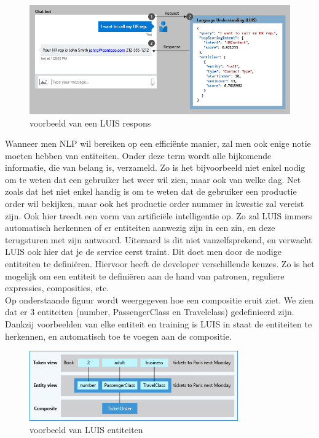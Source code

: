 \begin{figure}[H]
    \centering
    \includegraphics[width=1\textwidth]{img/LuisIntents}
\caption{voorbeeld van een LUIS respons \cite{Microsoft2019c}}
\end{figure}

Wanneer men NLP wil bereiken op een efficiënte manier, zal men ook enige notie moeten hebben van entiteiten. Onder deze term wordt alle bijkomende informatie, die van belang is, verzameld. Zo is het bijvoorbeeld niet enkel nodig om te weten dat een gebruiker het weer wil zien, maar ook van welke dag. Net zoals dat het niet enkel handig is om te weten dat de gebruiker een productie order wil bekijken, maar ook het productie order nummer in kwestie zal vereist zijn.
Ook hier treedt een vorm van artificiële intelligentie op. Zo zal LUIS immers automatisch herkennen of er entiteiten aanwezig zijn in een zin, en deze terugsturen met zijn antwoord. Uiteraard is dit niet vanzelfsprekend, en verwacht LUIS ook hier dat je de service eerst traint. Dit doet men door de nodige entiteiten te definiëren. Hiervoor heeft de developer verschillende keuzes. Zo is het mogelijk om een entiteit te definiëren aan de hand van patronen, reguliere expressies, composities, etc. \\
Op onderstaande figuur wordt weergegeven hoe een compositie eruit ziet. We zien dat er 3 entiteiten (number, PassengerClass en Travelclass) gedefinieerd zijn. Dankzij voorbeelden van elke entiteit en training is LUIS in staat de entiteiten te herkennen, en automatisch toe te voegen aan de compositie.

\begin{figure}[h]
    \centering
    \includegraphics[width=0.8\textwidth]{img/LuisEntities}
    \caption{voorbeeld van LUIS entiteiten \cite{Microsoftd}}
    \end{figure}

